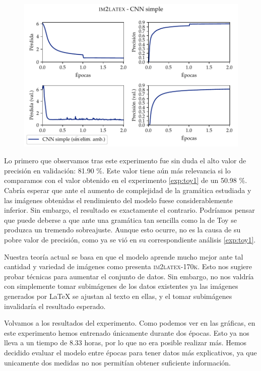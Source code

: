 \documentclass[a4paper, 20pt, dvipsnames]{article}
\begin{document}
\begin{figure}[H]
	\centering
	\includegraphics{fig/im2latex-1.pdf}
\end{figure}

Lo primero que observamos tras este experimento fue sin duda el alto valor de
precisión en validación: 81.90 \%. Este valor tiene aún más relevancia si lo
comparamos con el valor obtenido en el experimento \ref{exp:toy1} de un 50.98
\%. Cabría esperar que ante el aumento de complejidad de la gramática estudiada
y las imágenes obtenidas el rendimiento del modelo fuese considerablemente
inferior. Sin embargo, el resultado es exactamente el contrario. Podríamos
pensar que puede deberse a que ante una gramática tan sencilla como la de Toy se
produzca un tremendo sobreajuste. Aunque esto ocurre, no es la causa de su pobre
valor de precisión, como ya se vió en su correspondiente análisis
\ref{exp:toy1}.

Nuestra teoría actual se basa en que el modelo aprende mucho mejor ante tal
cantidad y variedad de imágenes como presenta \textsc{im2latex-170k}. Esto nos
sugiere probar técnicas para aumentar el conjunto de datos. Sin embargo, no nos
valdría con simplemente tomar subimágenes de los datos existentes ya las
imágenes generados por \LaTeX{} se ajustan al texto en ellas, y el tomar
subimágenes invalidaría el resultado esperado.

Volvamos a los resultados del experimento. Como podemos ver en las gráficas, en
este experimento hemos entrenado únicamente durante dos épocas. Esto ya nos
lleva a un tiempo de 8.33 horas, por lo que no era posible realizar más. Hemos
decidido evaluar el modelo entre épocas para tener datos más explicativos, ya
que unicamente dos medidas no nos permitían obtener suficiente información.
\end{document}
